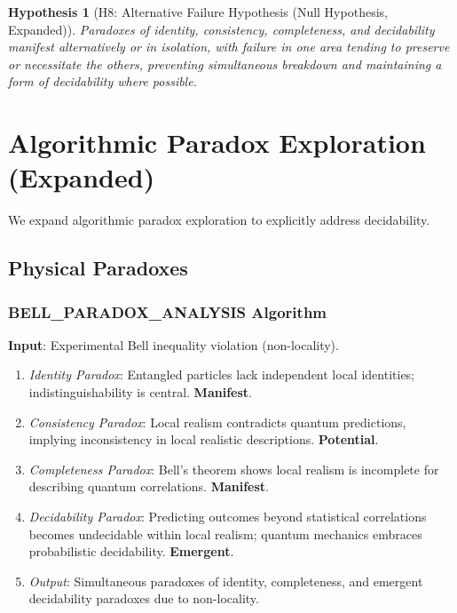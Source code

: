 \documentclass{article}
\newtheorem{hypothesis}{Hypothesis}
\begin{document}
	\begin{hypothesis}[H8: Alternative Failure Hypothesis (Null Hypothesis, Expanded)]
		Paradoxes of identity, consistency, completeness, and decidability manifest alternatively or in isolation, with failure in one area tending to preserve or necessitate the others, preventing simultaneous breakdown and maintaining a form of decidability where possible.
	\end{hypothesis}
	
	\section{Algorithmic Paradox Exploration (Expanded)}
	
	We expand algorithmic paradox exploration to explicitly address decidability.
	
	\subsection{Physical Paradoxes}
	
	\subsubsection{BELL\_PARADOX\_ANALYSIS Algorithm}
	\textbf{Input}: Experimental Bell inequality violation (non-locality).
	\begin{enumerate}
		\item \textit{Identity Paradox}: Entangled particles lack independent local identities; indistinguishability is central. \textbf{Manifest}.
		\item \textit{Consistency Paradox}: Local realism contradicts quantum predictions, implying inconsistency in local realistic descriptions. \textbf{Potential}.
		\item \textit{Completeness Paradox}: Bell's theorem shows local realism is incomplete for describing quantum correlations. \textbf{Manifest}.
		\item \textit{Decidability Paradox}:  Predicting outcomes beyond statistical correlations becomes undecidable within local realism; quantum mechanics embraces probabilistic decidability. \textbf{Emergent}.
		\item \textit{Output}: Simultaneous paradoxes of identity, completeness, and emergent decidability paradoxes due to non-locality.
	\end{enumerate}
	
\end{document}
